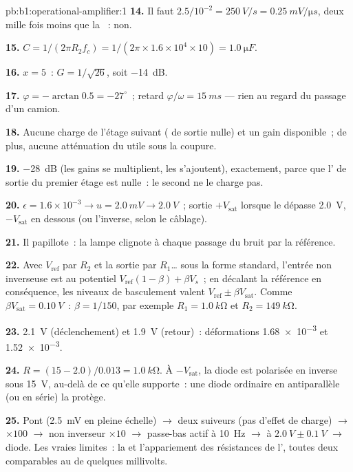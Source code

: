 \begin{solution}{pb:b1:operational-amplifier:1}
\textbf{14.} Il faut $2.5/10^{-2} = \qty{250}{V/s} = \qty{0.25}{mV/\micro s}$,
deux mille fois moins que la ~: non.

\textbf{15.} $C = 1/(2\pi R_2f_c) = 1/(2\pi \times 1.6\times10^4 \times 10)
= \qty{1.0}{\micro F}$.

\textbf{16.} $x = 5$~: $G = 1/\sqrt{26}$, soit \qty{-14}{dB}.

\textbf{17.} $\varphi = -\arctan 0.5 = -27^\circ$~; retard $\varphi/\omega =
\qty{15}{ms}$ --- rien au regard du passage d'un camion.

\textbf{18.} Aucune charge de l'étage suivant ( de sortie
nulle) et un gain disponible~; de plus, aucune atténuation du 
utile sous la coupure.

\textbf{19.} \qty{-28}{dB} (les gains se multiplient, les 
s'ajoutent), exactement, parce que l' de sortie du premier
étage est nulle~: le second ne le charge pas.

\textbf{20.} $\epsilon = 1.6\times10^{-3} \to u = \qty{2.0}{mV} \to
\qty{2.0}{V}$~; sortie $+V_{\mathrm{sat}}$ lorsque le  dépasse
\qty{2.0}{V}, $-V_{\mathrm{sat}}$ en dessous (ou l'inverse, selon le câblage).

\textbf{21.} Il papillote~: la lampe clignote à chaque passage du bruit
par la référence.

\textbf{22.} Avec $V_{\mathrm{ref}}$ par $R_2$ et la sortie par
$R_1$\dots{} sous la forme standard, l'entrée non inverseuse est au
potentiel $V_{\mathrm{ref}}(1 - \beta) + \beta V_s$~; en décalant la
référence en conséquence, les niveaux de basculement valent $V_{\mathrm{ref}} \pm \beta V_{\mathrm{sat}}$.
Comme $\beta V_{\mathrm{sat}} = \qty{0.10}{V}$~: $\beta = 1/150$, par exemple $R_1 =
\qty{1.0}{k\ohm}$ et $R_2 = \qty{149}{k\ohm}$.

\textbf{23.} \qty{2.1}{V} (déclenchement) et \qty{1.9}{V} (retour)~:
déformations \num{1.68e-3} et \num{1.52e-3}.

\textbf{24.} $R = (15 - 2.0)/0.013 = \qty{1.0}{k\ohm}$. À
$-V_{\mathrm{sat}}$, la diode est polarisée en inverse sous \qty{15}{V},
au-delà de ce qu'elle supporte~: une diode ordinaire en antiparallèle
(ou en série) la protège.

\textbf{25.} Pont (\qty{2.5}{mV} en pleine échelle) $\to$ deux suiveurs
(pas d'effet de charge) $\to$  $\times100$
$\to$ non inverseur $\times10$ $\to$ passe-bas actif à \qty{10}{Hz}
$\to$  à $\qty{2.0}{V} \pm \qty{0.1}{V}$ $\to$ diode.
Les vraies limites~: la  et l'appariement
des résistances de l', toutes deux comparables
au  de quelques millivolts.
\end{solution}

